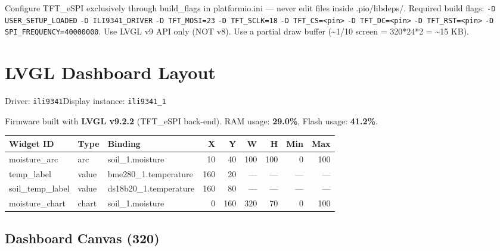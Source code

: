 \documentclass[a4paper,11pt]{article}
\begin{document}
Configure TFT\_eSPI exclusively through build\_flags in platformio.ini --- never edit files inside .pio/libdeps/. Required build flags: \texttt{-D USER\_SETUP\_LOADED}\allowbreak{} \texttt{-D ILI9341\_DRIVER}\allowbreak{} \texttt{-D TFT\_MOSI=23}\allowbreak{} \texttt{-D TFT\_SCLK=18}\allowbreak{} \texttt{-D TFT\_CS=<pin>}\allowbreak{} \texttt{-D TFT\_DC=<pin>}\allowbreak{} \texttt{-D TFT\_RST=<pin>}\allowbreak{} \texttt{-D SPI\_FREQUENCY=40000000}\allowbreak{}. Use LVGL v9 API only (NOT v8). Use a partial draw buffer (\~{}1/10 screen = 320*24*2 = \~{}15 KB).

\section{LVGL Dashboard Layout}

Driver: \texttt{ili9341}\quad Display instance: \texttt{ili9341\_1}

Firmware built with \textbf{LVGL v9.2.2} (TFT\_eSPI back-end). RAM usage: \textbf{29.0\%}, Flash usage: \textbf{41.2\%}.

{\small
\begin{longtable}{p{2.8cm}p{1.3cm}p{4.2cm}rrrrrr}
\toprule
\textbf{Widget ID} & \textbf{Type} & \textbf{Binding} & \textbf{X} & \textbf{Y} & \textbf{W} & \textbf{H} & \textbf{Min} & \textbf{Max} \\
\midrule
\endhead
\bottomrule
\endfoot
moisture\_arc & arc & soil\_1.moisture & 10 & 40 & 100 & 100 & 0 & 100 \\
temp\_label & value & bme280\_1.temperature & 160 & 20 & — & — & — & — \\
soil\_temp\_label & value & ds18b20\_1.temperature & 160 & 80 & — & — & — & — \\
moisture\_chart & chart & soil\_1.moisture & 0 & 160 & 320 & 70 & 0 & 100 \\
\end{longtable}
}

\subsection{Dashboard Canvas (320)}

\begin{center}
\end{center}
\end{document}
